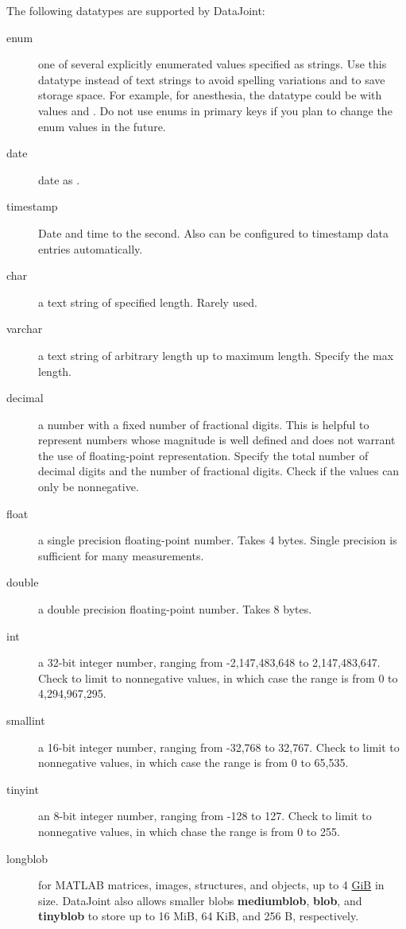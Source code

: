 \documentclass[10pt]{article}
\begin{document}
The following datatypes are supported by DataJoint:
\begin{description}
\item[enum] one of several explicitly enumerated values specified as strings. Use this datatype instead of text strings to avoid spelling variations and to save storage space.  For example, for anesthesia, the datatype could be  with values  and .  Do not use enums in primary keys if you plan to change the enum values in the future.
\item[date] date as .
\item[timestamp]  Date and time to the second.  Also can be configured to timestamp data entries automatically.
\item[char]  a text string of specified length. Rarely used.
\item[varchar]  a text string of arbitrary length up to maximum length. Specify the max length. 
\item[decimal]  a number with a fixed number of fractional digits.  This is helpful to represent numbers whose magnitude is well defined and does not warrant the use of floating-point representation.  Specify the total number of decimal digits and the number of fractional digits.  Check  if the values can only be nonnegative.
\item[float]  a single precision floating-point number.  Takes 4 bytes.  Single precision is sufficient for many measurements.
\item[double]  a double precision floating-point number. Takes 8 bytes.  
\item[int] a 32-bit integer number, ranging from -2,147,483,648 to 2,147,483,647.  Check  to limit to nonnegative values, in which case the range is from 0 to 4,294,967,295.
\item[smallint] a 16-bit integer number, ranging from -32,768 to 32,767.  Check  to limit to nonnegative values, in which case the range is from 0 to 65,535.
\item[tinyint] an 8-bit integer number, ranging from -128 to 127.   Check  to limit to nonnegative values, in which chase the range is from 0 to 255.
\item[longblob] for MATLAB matrices, images, structures, and objects, up to 4 \href{http://en.wikipedia.org/wiki/Gibibyte}{GiB} in size.  DataJoint also allows smaller blobs 
{\bf mediumblob}, {\bf blob}, and {\bf tinyblob} to store up to 16 MiB, 64 KiB, and 256 B, respectively. 
\end{description}
\end{document}
